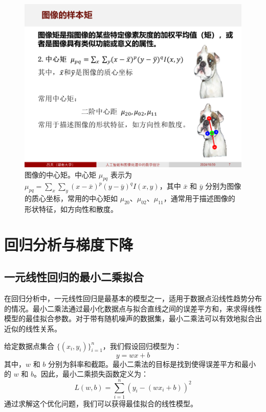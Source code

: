 \documentclass[
    report,     %
    oneside,    %
    UTF8,       %
    zihao=-4    %
]{config} %
\begin{document}
\begin{figure}[H] %
    \centering %
    \includegraphics[width=\linewidth]{figures/图像数据的处理方式/5.PNG}
    \caption[图像的中心矩]{图像的中心矩。中心矩 $\mu_{pq}$ 表示为 $\mu_{pq} = \sum_x \sum_y (x - \bar{x})^p (y - \bar{y})^q I(x,y)$，其中 $\bar{x}$ 和 $\bar{y}$ 分别为图像的质心坐标，常用的中心矩如 $\mu_{20}$、$\mu_{02}$、$\mu_{11}$，通常用于描述图像的形状特征，如方向性和散度。}
\end{figure}
\vspace{-0.7em}


\chapter{回归分析与梯度下降}

\section{一元线性回归的最小二乘拟合}

在回归分析中，一元线性回归是最基本的模型之一，适用于数据点沿线性趋势分布的情况。最小二乘法通过最小化数据点与拟合直线之间的误差平方和，来求得线性模型的最佳拟合参数。对于带有随机噪声的数据集，最小二乘法可以有效地拟合出近似的线性关系。

给定数据点集合 $\{(x_i, y_i)\}_{i=1}^n$，我们假设回归模型为：
\begin{equation}
    y = wx + b
\end{equation}
其中，$w$ 和 $b$ 分别为斜率和截距。最小二乘法的目标是找到使得误差平方和最小的 $w$ 和 $b$。因此，最小二乘损失函数定义为：
\begin{equation}
    L(w, b) = \sum_{i=1}^{n} (y_i - (wx_i + b))^2
\end{equation}
通过求解这个优化问题，我们可以获得最佳拟合的线性模型。
\end{document}
